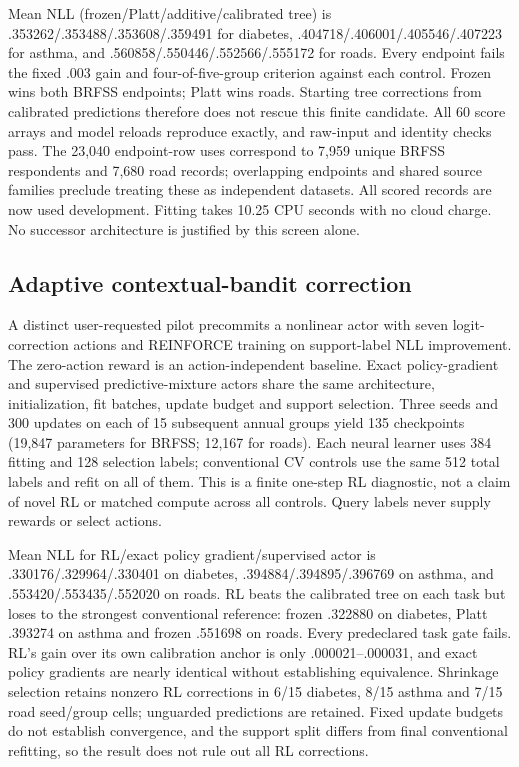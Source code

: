 \documentclass[10pt]{article}
\begin{document}
Mean NLL (frozen/Platt/additive/calibrated tree) is .353262/.353488/.353608/.359491 for diabetes, .404718/.406001/.405546/.407223 for asthma, and .560858/.550446/.552566/.555172 for roads. Every endpoint fails the fixed .003 gain and four-of-five-group criterion against each control. Frozen wins both BRFSS endpoints; Platt wins roads. Starting tree corrections from calibrated predictions therefore does not rescue this finite candidate. All 60 score arrays and model reloads reproduce exactly, and raw-input and identity checks pass. The 23,040 endpoint-row uses correspond to 7,959 unique BRFSS respondents and 7,680 road records; overlapping endpoints and shared source families preclude treating these as independent datasets. All scored records are now used development. Fitting takes 10.25 CPU seconds with no cloud charge. No successor architecture is justified by this screen alone.

\subsection{Adaptive contextual-bandit correction}
A distinct user-requested pilot precommits a nonlinear actor with seven logit-correction actions and REINFORCE training on support-label NLL improvement. The zero-action reward is an action-independent baseline. Exact policy-gradient and supervised predictive-mixture actors share the same architecture, initialization, fit batches, update budget and support selection. Three seeds and 300 updates on each of 15 subsequent annual groups yield 135 checkpoints (19,847 parameters for BRFSS; 12,167 for roads). Each neural learner uses 384 fitting and 128 selection labels; conventional CV controls use the same 512 total labels and refit on all of them. This is a finite one-step RL diagnostic, not a claim of novel RL or matched compute across all controls. Query labels never supply rewards or select actions.

Mean NLL for RL/exact policy gradient/supervised actor is .330176/.329964/.330401 on diabetes, .394884/.394895/.396769 on asthma, and .553420/.553435/.552020 on roads. RL beats the calibrated tree on each task but loses to the strongest conventional reference: frozen .322880 on diabetes, Platt .393274 on asthma and frozen .551698 on roads. Every predeclared task gate fails. RL's gain over its own calibration anchor is only .000021--.000031, and exact policy gradients are nearly identical without establishing equivalence. Shrinkage selection retains nonzero RL corrections in 6/15 diabetes, 8/15 asthma and 7/15 road seed/group cells; unguarded predictions are retained. Fixed update budgets do not establish convergence, and the support split differs from final conventional refitting, so the result does not rule out all RL corrections.
\end{document}

